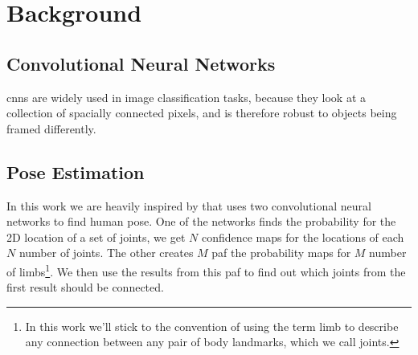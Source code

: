 \chapter{Background}

\section{Convolutional Neural Networks}

\gls{cnn}s are widely used in image classification tasks, because they look at a collection of spacially connected pixels, and is therefore robust to objects being framed differently. 

\section{Pose Estimation}
In this work we are heavily inspired by \cite{cao2017realtime} that uses two convolutional neural networks to find human pose. One of the networks finds the probability for the 2D location of a set of joints, we get $N$ confidence maps for the locations of each $N$ number of joints. The other creates $M$ \gls{paf} the probability maps for $M$ number of limbs\footnote{In this work we'll stick to the convention of using the term limb to describe any connection between any pair of body landmarks, which we call joints.}. We then use the results from this \gls{paf} to find out which joints from the first result should be connected.

